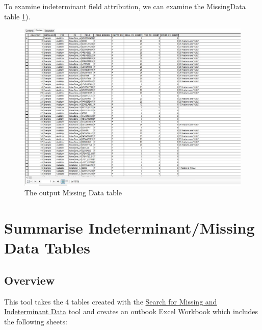 \documentclass[openany]{book}
\theoremstyle{definition}
\theoremstyle{definition}
\theoremstyle{definition}
\theoremstyle{remark}
\begin{document}
To examine indeterminant field attribution, we can examine the
MissingData table \ref{fig:indtSearchmissingData}).

\begin{figure}[H]

{\centering \includegraphics[width=6.25in,]{figures/indtSearch-missingData} 

}

\caption{The output Missing Data table}\label{fig:indtSearchmissingData}
\end{figure}

\hypertarget{summIndt}{\chapter{Summarise Indeterminant/Missing Data
Tables}\label{summIndt}}

\section{Overview}\label{overview-9}

This tool takes the 4 tables created with the
\protect\hyperlink{indtSearch}{Search for Missing and Indeterminant
Data} tool and creates an outbook Excel Workbook which includes the
following sheets:
\end{document}
